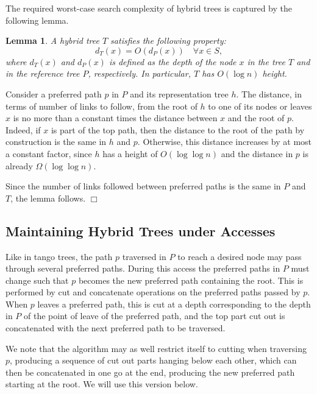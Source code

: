 \documentclass[letterpaper,11pt]{article}
\newtheorem{lemma}{Lemma}
\newenvironment{proof}{\noindent {\bf Proof:}}{{\hfill $\Box$}}
\newcommand{\toppath}{top path}
\newcounter{todo}
\newcommand{\todo}[1]{}
\begin{document}
The required worst-case search complexity of hybrid trees is captured by
the following lemma.
\begin{lemma}
\label{height}
A hybrid tree $T$ satisfies the following property:
$$
d_T(x)= O(d_P(x)) \quad \forall x \in S,
$$ 
where $d_T(x)$ and $d_P(x)$ is defined as the depth of the node $x$ in the
tree $T$ and in the reference tree $P$, respectively. In particular, $T$
has $O(\log n)$ height.
\end{lemma}
\begin{proof}
Consider a preferred path $p$ in $P$ and its representation tree $h$. The
distance, in terms of number of links to follow, from the root of $h$ to one
of its nodes or leaves $x$ is no more than a constant times the distance
between $x$ and the root of $p$. Indeed, if $x$ is part of the \toppath{},
then the distance to the root of the path by construction is the same in
$h$ and $p$. Otherwise, this distance increases by at most a constant
factor, since $h$ has a height of $O(\log \log n)$ and the distance in $p$
is already $\Omega(\log \log n)$.

Since the number of links followed between preferred paths is the same in
$P$ and $T$, the lemma follows. \todo{I (Rolf) here removed an argument I
didn't see the need for. Karim, please check.\\
(Karim) That's correct.}
\end{proof}

\subsection{Maintaining Hybrid Trees under Accesses}
\label{maintaining-hybrid-trees}

Like in tango trees, the path $p$ traversed in $P$ to reach a desired node
may pass through several preferred paths. During this access the preferred
paths in $P$ must change such that $p$ becomes the new preferred path
containing the root. This is performed by cut and concatenate operations on
the preferred paths passed by $p$. When $p$ leaves a preferred path, this
is cut at a depth corresponding to the depth in $P$ of the point of leave
of the preferred path, and the top part cut out is concatenated with the
next preferred path to be traversed.

We note that the algorithm may as well restrict itself to cutting when
traversing $p$, producing a sequence of cut out parts hanging below each
other, which can then be concatenated in one go at the end, producing the
new preferred path starting at the root. We will use this version below.
\end{document}
